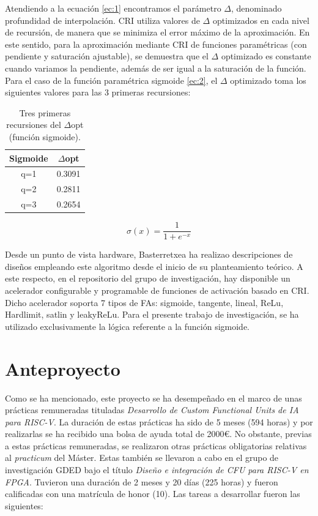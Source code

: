 Atendiendo a la ecuación \eqref{ec:1} encontramos el parámetro $\Delta$, denominado profundidad de interpolación.
CRI utiliza valores de $\Delta$ optimizados en cada nivel de recursión, de manera que se minimiza el error máximo de la aproximación.
En este sentido, para la aproximación mediante CRI de funciones paramétricas (con pendiente y saturación ajustable), se demuestra que el $\Delta$ optimizado es constante cuando variamos la pendiente, además de ser igual a la saturación de la función.
Para el caso de la función paramétrica sigmoide \eqref{ec:2}, el $\Delta$ optimizado toma los siguientes valores para las 3 primeras recursiones:

\begin{table}[h!]
\centering
\caption{Tres primeras recursiones del $\Delta$opt (función sigmoide).}
\label{tab:1}
\begin{tabular}{|c|c|}
\hline
Sigmoide & $\Delta$opt    \\ \hline
q=1      & 0.3091 \\ \hline
q=2      & 0.2811 \\ \hline
q=3      & 0.2654 \\ \hline
\end{tabular}
\end{table}

\begin{equation}\label{ec:2}
\sigma(x)= \frac{1}{1 + e^{-x}}\tag{**}
\end{equation}

Desde un punto de vista hardware, Basterretxea ha realizao descripciones de diseños empleando este algoritmo desde el inicio de su planteamiento teórico.
A este respecto, en el repositorio del grupo de investigación, hay disponible un acelerador configurable y programable de funciones de activación basado en CRI.
Dicho acelerador soporta 7 tipos de FAs: sigmoide, tangente, lineal, ReLu, Hardlimit, satlin y leakyReLu. 
Para el presente trabajo de investigación, se ha utilizado exclusivamente la lógica referente a la función sigmoide.

\section{Anteproyecto}

\label{antepro}

Como se ha mencionado, este proyecto se ha desempeñado en el marco de unas prácticas remuneradas tituladas \textit{Desarrollo de Custom Functional Units de IA para RISC-V}.
La duración de estas prácticas ha sido de 5 meses (594 horas) y por realizarlas se ha recibido una bolsa de ayuda total de 2000€.
No obstante, previas a estas prácticas remuneradas, se realizaron otras prácticas obligatorias relativas al \textit{practicum} del Máster.
Estas también se llevaron a cabo en el grupo de investigación GDED bajo el título \textit{Diseño e integración de CFU para RISC-V en FPGA}.
Tuvieron una duración de 2 meses y 20 días (225 horas) y fueron calificadas con una matrícula de honor (10).
Las tareas a desarrollar fueron las siguientes:

